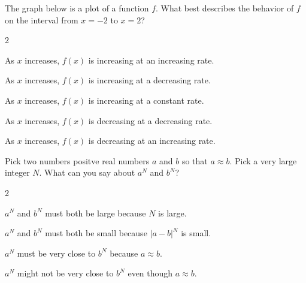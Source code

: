 \documentclass[12pt]{ximera}
\renewenvironment{multipleChoice}
{\begin{trivlist}\item[\hskip\labelsep\small\bfseries Choose the best answer:]
\hfil\begin{enumerate}\begin{multicols}{2}}
 {\end{multicols}\end{enumerate}\end{trivlist}}
\renewcommand{\choice}[2][]{\item \begin{minipage}[t]{2in}#2\end{minipage}\ifthenelse{\boolean{#1}}{\ifhandout \else  \fi}{}}
\begin{document}
\begin{minipage}{\textwidth}
\begin{problem}
  The graph below is a plot of a function $f$.  What best describes
  the behavior of $f$ on the interval from $x=-2$ to $x=2$?
  \begin{image}
    \end{image}
  \begin{multipleChoice}
    \choice{As $x$ increases, $f(x)$ is increasing at an increasing rate.}
    \choice[correct]{As $x$ increases, $f(x)$ is increasing at a decreasing rate.}
    \choice{As $x$ increases, $f(x)$ is increasing at a constant rate.}
    \choice{As $x$ increases, $f(x)$ is decreasing at a decreasing rate.}
    \choice{As $x$ increases, $f(x)$ is decreasing at an increasing rate.}
  \end{multipleChoice}
\end{problem}
\end{minipage}

\vspace{6ex}

\begin{minipage}{\textwidth}
\begin{problem} 

  Pick two numbers positve real numbers $a$ and $b$ so that
  $a \approx b$.  Pick a very large integer $N$.  What can you say
  about $a^N$ and $b^N$?
  \begin{multipleChoice}
    \choice{$a^N$ and $b^N$ must both be large because $N$ is large.}
    \choice{$a^N$ and $b^N$ must both be small because $|a-b|^N$ is small.}
    \choice{$a^N$ must be very close to $b^N$ because $a \approx b$.}
    \choice[correct]{$a^N$ might not be very close to $b^N$ even though $a \approx b$.}
  \end{multipleChoice}
\end{problem}
\end{minipage}
\end{document}
